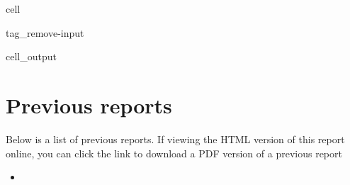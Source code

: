 \documentclass[letterpaper,10pt,english]{jupyterBook}
\begin{document}
\begin{sphinxuseclass}{cell}
\begin{sphinxuseclass}{tag_remove-input}
\begin{sphinxVerbatimOutput}
\begin{sphinxuseclass}{cell_output}
\end{sphinxuseclass}\end{sphinxVerbatimOutput}

\end{sphinxuseclass}
\end{sphinxuseclass}
\sphinxstepscope


\chapter{Previous reports}
\label{\detokenize{previous_reports:previous-reports}}\label{\detokenize{previous_reports::doc}}
\sphinxAtStartPar
Below is a list of previous reports. If viewing the HTML version of this report online, you can click the link to download a PDF version of a previous report
\begin{itemize}
\item {} 
\sphinxAtStartPar
{}

\end{itemize}







\renewcommand{\indexname}{Index}
\printindex
\end{document}
